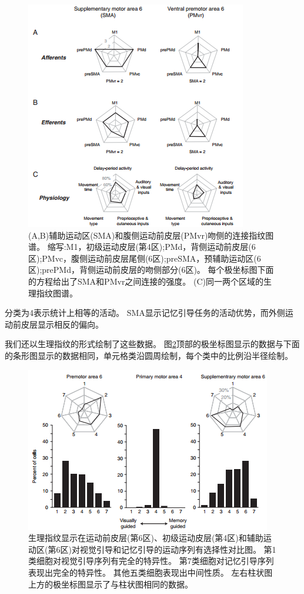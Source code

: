 \begin{figure}[!htb]
	\centering
	\includegraphics[width=0.8\linewidth]{image_pfc/Fig_1_9}
	\caption{(A,B)辅助运动区(SMA)和腹侧运动前皮层(PMvr)吻侧的连接指纹图谱。
		缩写:M1，初级运动皮层(第4区);PMd，背侧运动前皮层(6区);PMvc，腹侧运动前皮层尾侧(6区);preSMA，预辅助运动区(6区);prePMd，背侧运动前皮层的吻侧部分(6区)。
		每个极坐标图下面的方程给出了SMA和PMvr之间连接的强度。
		(C)同一两个区域的生理指纹图谱\cite{passingham2002anatomical}。	\label{fig:1_9}}
\end{figure}


\par
分类为4表示统计上相等的活动。
SMA显示记忆引导任务的活动优势，而外侧运动前皮层显示相反的偏向。
\par
我们还以生理指纹的形式绘制了这些数据。
图\ref{fig:1_10}顶部的极坐标图显示的数据与下面的条形图显示的数据相同，单元格类沿圆周绘制，每个类中的比例沿半径绘制。

\begin{figure}[!htb]
	\centering
	\includegraphics[width=0.8\linewidth]{image_pfc/Fig_1_10}
	\caption{生理指纹显示在运动前皮层(第6区)、初级运动皮层(第4区)和辅助运动区(第6区)对视觉引导和记忆引导的运动序列有选择性对比图。
		第1类细胞对视觉引导序列有完全的特异性。
		第7类细胞对记忆引导序列表现出完全的特异性。
		其他五类细胞表现出中间性质。
		左右柱状图上方的极坐标图显示了与柱状图相同的数据\cite{mushiake1991neuronal}。\label{fig:1_10}}
\end{figure}


